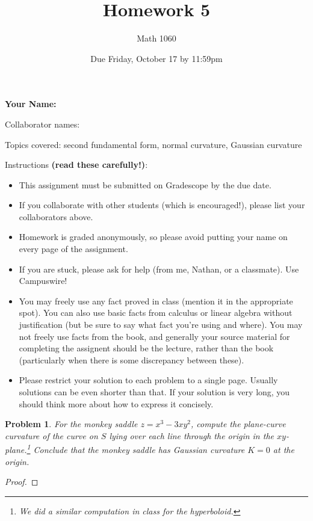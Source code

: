\documentclass[11pt]{article}
\author{Math 1060}
\date{Due Friday, October 17 by 11:59pm}
\title{Homework 5}
\newtheorem{problem}{Problem}
\begin{document}
\maketitle


{\bf\Large Your Name:} 

Collaborator names: 


\vspace{.3in}
Topics covered: second fundamental form, normal curvature, Gaussian curvature

Instructions {\bf (read these carefully!)}: 
\begin{itemize}
\item This assignment must be submitted on Gradescope by the due date. 
\item If you collaborate with other students (which is encouraged!), please list your collaborators above. 
\item Homework is graded anonymously, so please avoid putting your name on every page of the assignment.
\item If you are stuck, please ask for help (from me, Nathan, or a classmate). Use Campuswire!  
\item You may freely use any fact proved in class (mention it in the appropriate spot). You can also use basic facts from calculus or linear algebra without justification (but be sure to say what fact you're using and where). You may not freely use facts from the book, and generally your source material for completing the assignent should be the lecture, rather than the book (particularly when there is some discrepancy between these). 
\item Please restrict your solution to each problem to a single page. Usually solutions can be even shorter than that. If your solution is very long, you should think more about how to express it concisely.
\end{itemize}
\pagebreak 





\begin{problem}
For the monkey saddle $z=x^3-3xy^2$, compute the plane-curve curvature of the curve on $S$ lying over each line through the origin in the $xy$-plane.\footnote{We did a similar computation in class for the hyperboloid.} Conclude that the monkey saddle has Gaussian curvature $K=0$ at the origin. 
\end{problem}

\begin{proof}

\end{proof}
\end{document}
